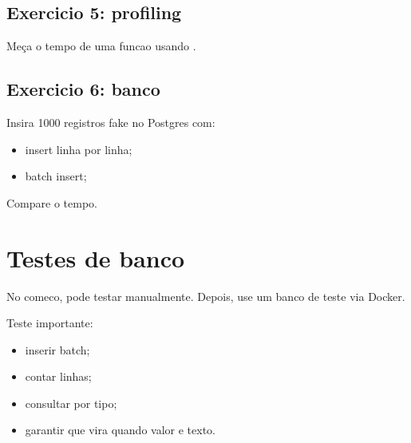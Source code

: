 \subsection{Exercicio 5: profiling}

Meça o tempo de uma funcao usando .

\subsection{Exercicio 6: banco}

Insira 1000 registros fake no Postgres com:

\begin{itemize}
  \item insert linha por linha;
  \item batch insert;
\end{itemize}

Compare o tempo.

\section{Testes de banco}

No comeco, pode testar manualmente. Depois, use um banco de teste via Docker.

Teste importante:

\begin{itemize}
  \item inserir batch;
  \item contar linhas;
  \item consultar por tipo;
  \item garantir que  vira  quando valor e texto.
\end{itemize}
